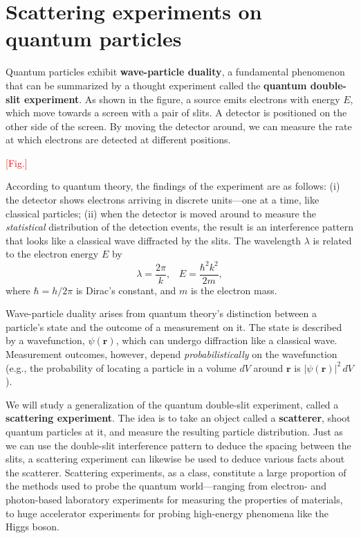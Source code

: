 \documentclass[pra,11pt]{revtex4}
\begin{document}

\section{Scattering experiments on quantum particles}

Quantum particles exhibit \textbf{wave-particle duality}, a
fundamental phenomenon that can be summarized by a thought experiment
called the \textbf{quantum double-slit experiment}.  As shown in the
figure, a source emits electrons with energy $E$, which move towards a
screen with a pair of slits.  A detector is positioned on the other
side of the screen.  By moving the detector around, we can measure the
rate at which electrons are detected at different positions.

\textcolor{red}{[Fig.]}

According to quantum theory, the findings of the experiment are as
follows: (i) the detector shows electrons arriving in discrete
units---one at a time, like classical particles; (ii) when the
detector is moved around to measure the \textit{statistical}
distribution of the detection events, the result is an interference
pattern that looks like a classical wave diffracted by the slits.  The
wavelength $\lambda$ is related to the electron energy $E$ by
$$\lambda = \frac{2\pi}{k}, \;\;\; E = \frac{\hbar^2k^2}{2m},$$
where $\hbar = h/2\pi$ is Dirac's constant, and $m$ is the electron
mass.

Wave-particle duality arises from quantum theory's distinction between
a particle's state and the outcome of a measurement on it.  The state
is described by a wavefunction, $\psi(\mathbf{r})$, which can undergo
diffraction like a classical wave.  Measurement outcomes, however,
depend \textit{probabilistically} on the wavefunction (e.g., the
probability of locating a particle in a volume $dV$ around
$\mathbf{r}$ is $|\psi(\mathbf{r})|^2 \,dV$).

We will study a generalization of the quantum double-slit experiment,
called a \textbf{scattering experiment}.  The idea is to take an
object called a \textbf{scatterer}, shoot quantum particles at it, and
measure the resulting particle distribution.  Just as we can use the
double-slit interference pattern to deduce the spacing between the
slits, a scattering experiment can likewise be used to deduce various
facts about the scatterer.  Scattering experiments, as a class,
constitute a large proportion of the methods used to probe the quantum
world---ranging from electron- and photon-based laboratory experiments
for measuring the properties of materials, to huge accelerator
experiments for probing high-energy phenomena like the Higgs boson.
\end{document}
